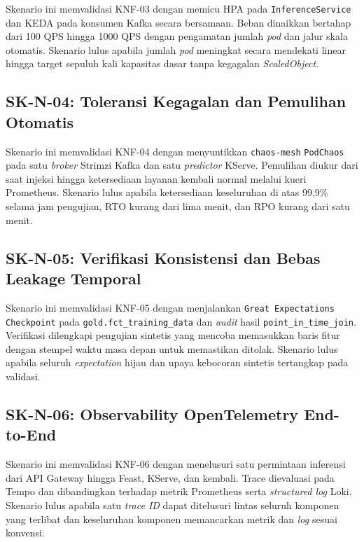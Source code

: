 Skenario ini memvalidasi KNF-03 dengan memicu HPA pada \texttt{InferenceService} dan KEDA pada konsumen Kafka secara bersamaan. Beban dinaikkan bertahap dari 100 QPS hingga 1000 QPS dengan pengamatan jumlah \textit{pod} dan jalur skala otomatis. Skenario lulus apabila jumlah \textit{pod} meningkat secara mendekati linear hingga target sepuluh kali kapasitas dasar tanpa kegagalan \textit{ScaledObject}.

\subsection{SK-N-04: Toleransi Kegagalan dan Pemulihan Otomatis}

Skenario ini memvalidasi KNF-04 dengan menyuntikkan \texttt{chaos-mesh} \texttt{PodChaos} pada satu \textit{broker} Strimzi Kafka dan satu \textit{predictor} KServe. Pemulihan diukur dari saat injeksi hingga ketersediaan layanan kembali normal melalui kueri Prometheus. Skenario lulus apabila ketersediaan keseluruhan di atas 99,9\% selama jam pengujian, RTO kurang dari lima menit, dan RPO kurang dari satu menit.

\subsection{SK-N-05: Verifikasi Konsistensi dan Bebas Leakage Temporal}

Skenario ini memvalidasi KNF-05 dengan menjalankan \texttt{Great Expectations Checkpoint} pada \texttt{gold.fct\_training\_data} dan \textit{audit} hasil \texttt{point\_in\_time\_join}. Verifikasi dilengkapi pengujian sintetis yang mencoba memasukkan baris fitur dengan stempel waktu masa depan untuk memastikan ditolak. Skenario lulus apabila seluruh \textit{expectation} hijau dan upaya kebocoran sintetis tertangkap pada validasi.

\subsection{SK-N-06: Observability OpenTelemetry End-to-End}

Skenario ini memvalidasi KNF-06 dengan menelusuri satu permintaan inferensi dari API Gateway hingga Feast, KServe, dan kembali. Trace dievaluasi pada Tempo dan dibandingkan terhadap metrik Prometheus serta \textit{structured log} Loki. Skenario lulus apabila satu \textit{trace ID} dapat ditelusuri lintas seluruh komponen yang terlibat dan keseluruhan komponen memancarkan metrik dan \textit{log} sesuai konvensi.

